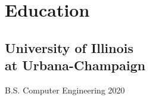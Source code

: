 \documentclass[9pt]{extarticle}
\renewcommand{\maketitle}{
    \begin{center}
        {\Huge\bfseries
        \theauthor}
        \vspace{2em}
    \end{center}
}
\begin{document}
\author{David Choo}
\maketitle


\begin{minipage}[t]{.25\textwidth}
    \section{Education}
    \vspace{0.5em}
    \subsection{University of Illinois\\at Urbana-Champaign}
    \vspace{0.5em}
    B.S. Computer Engineering 2020 \\


\end{minipage}
\end{document}
